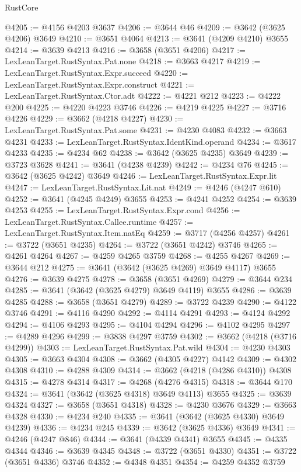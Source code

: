 \begin{lexlean}{RustCore}
\begin{coremodule}
@4205 := @4156 @4203 @3637
@4206 := @3644 @46
@4209 := @3642 (@3625 @4206) @3649
@4210 := @3651 @4064
@4213 := @3641 (@4209 @4210) @3655
@4214 := @3639 @4213
@4216 := @3658 (@3651 @4206)
@4217 := LexLeanTarget.RustSyntax.Pat.none
@4218 := @3663 @4217
@4219 := LexLeanTarget.RustSyntax.Expr.succeed
@4220 := LexLeanTarget.RustSyntax.Expr.construct
@4221 := LexLeanTarget.RustSyntax.Ctor.adt
@4222 := @4221 @212
@4223 := @4222 @200
@4225 := @4220 @4223 @3746
@4226 := @4219 @4225
@4227 := @3716 @4226
@4229 := @3662 (@4218 @4227)
@4230 := LexLeanTarget.RustSyntax.Pat.some
@4231 := @4230 @4083
@4232 := @3663 @4231
@4233 := LexLeanTarget.RustSyntax.IdentKind.operand
@4234 := @3617 @4233
@4235 := @4234 @62
@4238 := @3642 (@3625 @4235) @3649
@4239 := @3723 @3628
@4241 := @3641 (@4238 @4239)
@4242 := @4234 @76
@4245 := @3642 (@3625 @4242) @3649
@4246 := LexLeanTarget.RustSyntax.Expr.lit
@4247 := LexLeanTarget.RustSyntax.Lit.nat
@4249 := @4246 (@4247 @610)
@4252 := @3641 (@4245 @4249) @3655
@4253 := @4241 @4252
@4254 := @3639 @4253
@4255 := LexLeanTarget.RustSyntax.Expr.cond
@4256 := LexLeanTarget.RustSyntax.Callee.runtime
@4257 := LexLeanTarget.RustSyntax.Item.natEq
@4259 := @3717 (@4256 @4257)
@4261 := @3722 (@3651 @4235)
@4264 := @3722 (@3651 @4242) @3746
@4265 := @4261 @4264
@4267 := @4259 @4265 @3759
@4268 := @4255 @4267
@4269 := @3644 @212
@4275 := @3641 (@3642 (@3625 @4269) @3649 @4117) @3655
@4276 := @3639 @4275
@4278 := @3658 (@3651 @4269)
@4279 := @3644 @234
@4285 := @3641 (@3642 (@3625 @4279) @3649 @4119) @3655
@4286 := @3639 @4285
@4288 := @3658 (@3651 @4279)
@4289 := @3722 @4239
@4290 := @4122 @3746
@4291 := @4116 @4290
@4292 := @4114 @4291
@4293 := @4124 @4292
@4294 := @4106 @4293
@4295 := @4104 @4294
@4296 := @4102 @4295
@4297 := @4289 @4296
@4299 := @3838 @4297 @3759
@4302 := @3662 (@4218 (@3716 @4299))
@4303 := LexLeanTarget.RustSyntax.Pat.wild
@4304 := @4230 @4303
@4305 := @3663 @4304
@4308 := @3662 (@4305 @4227) @4142
@4309 := @4302 @4308
@4310 := @4288 @4309
@4314 := @3662 (@4218 (@4286 @4310)) @4308
@4315 := @4278 @4314
@4317 := @4268 (@4276 @4315)
@4318 := @3644 @170
@4324 := @3641 (@3642 (@3625 @4318) @3649 @4113) @3655
@4325 := @3639 @4324
@4327 := @3658 (@3651 @4318)
@4328 := @4230 @3676
@4329 := @3663 @4328
@4330 := @4234 @240
@4335 := @3641 (@3642 (@3625 @4330) @3649 @4239)
@4336 := @4234 @245
@4339 := @3642 (@3625 @4336) @3649
@4341 := @4246 (@4247 @846)
@4344 := @3641 (@4339 @4341) @3655
@4345 := @4335 @4344
@4346 := @3639 @4345
@4348 := @3722 (@3651 @4330)
@4351 := @3722 (@3651 @4336) @3746
@4352 := @4348 @4351
@4354 := @4259 @4352 @3759

\end{coremodule}
\end{lexlean}
